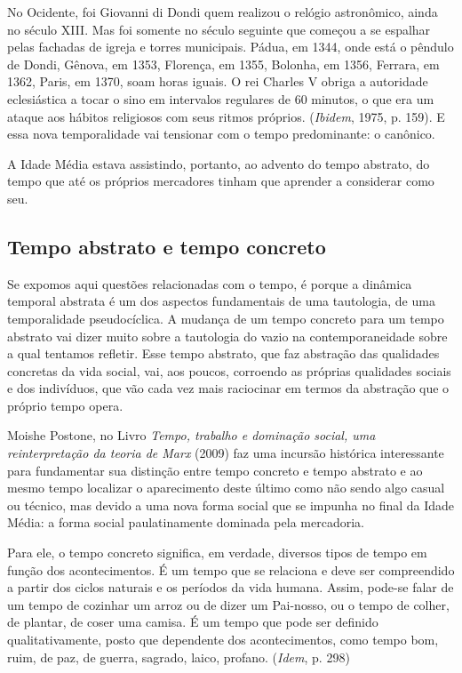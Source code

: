 No Ocidente, foi Giovanni di Dondi quem realizou o relógio astronômico,
ainda no século XIII. Mas foi somente no século seguinte que começou a
se espalhar pelas fachadas de igreja e torres municipais. Pádua, em
1344, onde está o pêndulo de Dondi, Gênova, em 1353, Florença, em 1355,
Bolonha, em 1356, Ferrara, em 1362, Paris, em 1370, soam horas iguais. O
rei Charles V obriga a autoridade eclesiástica a tocar o sino em
intervalos regulares de 60 minutos, o que era um ataque aos hábitos
religiosos com seus ritmos próprios. (\emph{Ibidem}, 1975, p. 159). E
essa nova temporalidade vai tensionar com o tempo predominante: o
canônico.

A Idade Média estava assistindo, portanto, ao advento do tempo abstrato,
do tempo que até os próprios mercadores tinham que aprender a considerar
como seu.

\subsection{Tempo abstrato e tempo concreto}

Se expomos aqui questões relacionadas com o tempo, é porque a dinâmica
temporal abstrata é um dos aspectos fundamentais de uma tautologia, de
uma temporalidade pseudocíclica. A mudança de um tempo concreto para um
tempo abstrato vai dizer muito sobre a tautologia do vazio na
contemporaneidade sobre a qual tentamos refletir. Esse tempo abstrato,
que faz abstração das qualidades concretas da vida social, vai, aos
poucos, corroendo as próprias qualidades sociais e dos indivíduos, que
vão cada vez mais raciocinar em termos da abstração que o próprio tempo
opera.

Moishe Postone, no Livro \emph{Tempo, trabalho e dominação social, uma
reinterpretação da teoria de Marx} (2009) faz uma incursão histórica
interessante para fundamentar sua distinção entre tempo concreto e tempo
abstrato e ao mesmo tempo localizar o aparecimento deste último como não
sendo algo casual ou técnico, mas devido a uma nova forma social que se
impunha no final da Idade Média: a forma social paulatinamente dominada
pela mercadoria.

Para ele, o tempo concreto significa, em verdade, diversos tipos de
tempo em função dos acontecimentos. É um tempo que se relaciona e deve
ser compreendido a partir dos ciclos naturais e os períodos da vida
humana. Assim, pode-se falar de um tempo de cozinhar um arroz ou de
dizer um Pai-nosso, ou o tempo de colher, de plantar, de coser uma
camisa. É um tempo que pode ser definido qualitativamente, posto que
dependente dos acontecimentos, como tempo bom, ruim, de paz, de guerra,
sagrado, laico, profano. (\emph{Idem}, p. 298)

